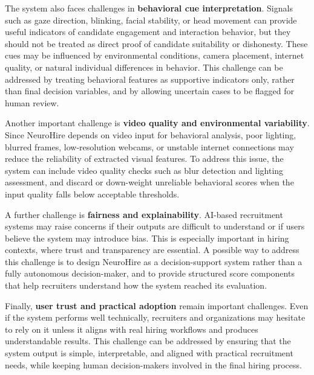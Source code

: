 The system also faces challenges in \textbf{behavioral cue interpretation}. Signals such as gaze direction, blinking, facial stability, or head movement can provide useful indicators of candidate engagement and interaction behavior, but they should not be treated as direct proof of candidate suitability or dishonesty. These cues may be influenced by environmental conditions, camera placement, internet quality, or natural individual differences in behavior. This challenge can be addressed by treating behavioral features as supportive indicators only, rather than final decision variables, and by allowing uncertain cases to be flagged for human review.

Another important challenge is \textbf{video quality and environmental variability}. Since NeuroHire depends on video input for behavioral analysis, poor lighting, blurred frames, low-resolution webcams, or unstable internet connections may reduce the reliability of extracted visual features. To address this issue, the system can include video quality checks such as blur detection and lighting assessment, and discard or down-weight unreliable behavioral scores when the input quality falls below acceptable thresholds.

A further challenge is \textbf{fairness and explainability}. AI-based recruitment systems may raise concerns if their outputs are difficult to understand or if users believe the system may introduce bias. This is especially important in hiring contexts, where trust and transparency are essential. A possible way to address this challenge is to design NeuroHire as a decision-support system rather than a fully autonomous decision-maker, and to provide structured score components that help recruiters understand how the system reached its evaluation.

Finally, \textbf{user trust and practical adoption} remain important challenges. Even if the system performs well technically, recruiters and organizations may hesitate to rely on it unless it aligns with real hiring workflows and produces understandable results. This challenge can be addressed by ensuring that the system output is simple, interpretable, and aligned with practical recruitment needs, while keeping human decision-makers involved in the final hiring process.